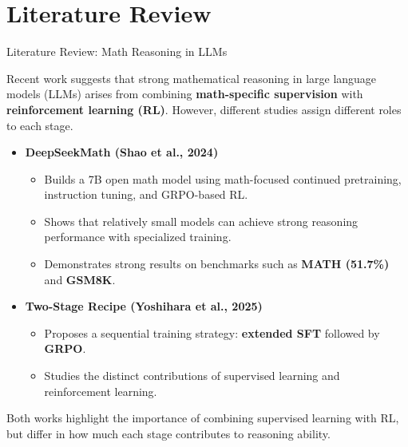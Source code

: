 \documentclass[aspectratio=169,10pt]{beamer}
\begin{document}
\section{Literature Review}
\begin{frame}{Literature Review: Math Reasoning in LLMs}

Recent work suggests that strong mathematical reasoning in large language models (LLMs) arises from combining
\textbf{math-specific supervision} with \textbf{reinforcement learning (RL)}. 
However, different studies assign different roles to each stage.

\begin{itemize}
    \item \textbf{DeepSeekMath (Shao et al., 2024)}
    \begin{itemize}
        \item Builds a 7B open math model using math-focused continued pretraining, instruction tuning, and GRPO-based RL.
        \item Shows that relatively small models can achieve strong reasoning performance with specialized training.
        \item Demonstrates strong results on benchmarks such as \textbf{MATH (51.7\%)} and \textbf{GSM8K}.
    \end{itemize}

    \item \textbf{Two-Stage Recipe (Yoshihara et al., 2025)}
    \begin{itemize}
        \item Proposes a sequential training strategy: \textbf{extended SFT} followed by \textbf{GRPO}.
        \item Studies the distinct contributions of supervised learning and reinforcement learning.
    \end{itemize}
\end{itemize}

Both works highlight the importance of combining supervised learning with RL, but differ in how much each stage contributes to reasoning ability.
\end{frame}
\end{document}
